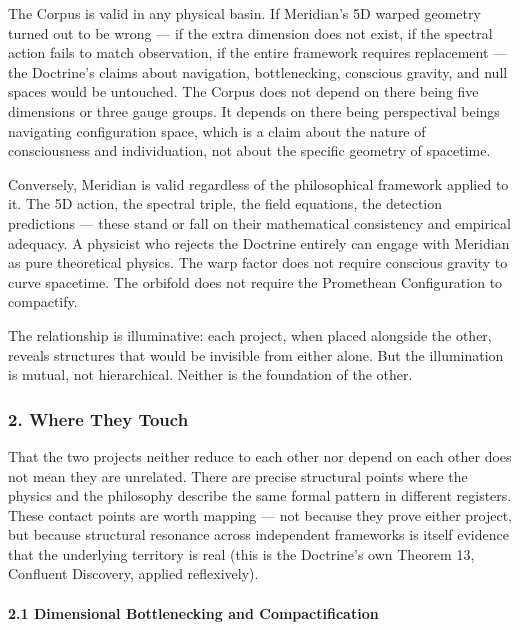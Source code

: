 The Corpus is valid in any physical basin. If Meridian's 5D warped geometry turned out to be wrong — if the extra dimension does not exist, if the spectral action fails to match observation, if the entire framework requires replacement — the Doctrine's claims about navigation, bottlenecking, conscious gravity, and null spaces would be untouched. The Corpus does not depend on there being five dimensions or three gauge groups. It depends on there being perspectival beings navigating configuration space, which is a claim about the nature of consciousness and individuation, not about the specific geometry of spacetime.


Conversely, Meridian is valid regardless of the philosophical framework applied to it. The 5D action, the spectral triple, the field equations, the detection predictions — these stand or fall on their mathematical consistency and empirical adequacy. A physicist who rejects the Doctrine entirely can engage with Meridian as pure theoretical physics. The warp factor does not require conscious gravity to curve spacetime. The orbifold does not require the Promethean Configuration to compactify.


The relationship is illuminative: each project, when placed alongside the other, reveals structures that would be invisible from either alone. But the illumination is mutual, not hierarchical. Neither is the foundation of the other.


\bigskip\noindent\makebox[\textwidth]{\color{rulegray}\rule{5cm}{0.3pt}}\bigskip


\subsubsection*{2. Where They Touch}


That the two projects neither reduce to each other nor depend on each other does not mean they are unrelated. There are precise structural points where the physics and the philosophy describe the same formal pattern in different registers. These contact points are worth mapping — not because they prove either project, but because structural resonance across independent frameworks is itself evidence that the underlying territory is real (this is the Doctrine's own Theorem 13, Confluent Discovery, applied reflexively).


\paragraph*{2.1 Dimensional Bottlenecking and Compactification}


